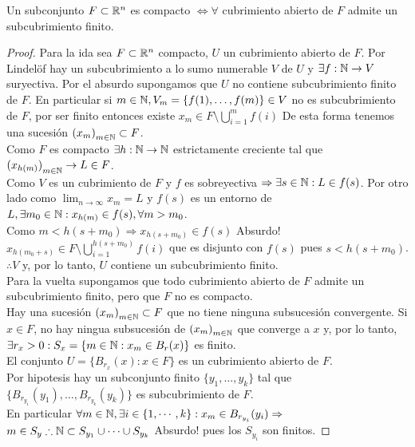 \begin{corollary}
  Un subconjunto \(F \subset \mathbb{R}^n\) es compacto \(\iff \forall \) cubrimiento abierto de \(F\) admite un subcubrimiento finito.
  \begin{proof}
    Para la ida sea \(F \subset \mathbb{R}^n\) compacto, \(U\) un cubrimiento abierto de \(F\). Por Lindelöf hay un subcubrimiento a lo sumo numerable \(V\) de \(U\) y \(\exists f: \mathbb{N} \to V\) suryectiva.
    Por el absurdo supongamos que \(U\) no contiene subcubrimiento finito de \(F\).
    En particular si \(m \in \mathbb{N}, V_m = \{ f(1), \ldots, f(m) \} \in V\) no es subcubrimiento de \(F\), por ser finito entonces existe \( x_m \in F \setminus \bigcup_{i = 1}^m f(i) \)
    De esta forma tenemos una sucesión \( {(x_m)}_{m \in \mathbb{N}} \subset F \). \\
    Como \(F\) es compacto \(\exists h: \mathbb{N} \to \mathbb{N} \) estrictamente creciente tal que \({(x_{h(m)})}_{m \in \mathbb{N}} \to L \in F\). \\
    Como \(V\) es un cubrimiento de \(F\) y \(f\) es sobreyectiva \(\Rightarrow \exists s \in \mathbb{N} : L \in f(s)\).
    Por otro lado como \(\lim_{n \to \infty} x_m = L\) y \(f(s)\) es un entorno de \(L, \exists m_0 \in \mathbb{N} : x_{h(m)} \in f(s), \forall m > m_0\). \\
    Como \(m < h(s + m_0) \Rightarrow x_{h(s+m_0)} \in f(s)\) Absurdo! \\
    \(x_{h(m_0 + s)} \in F \setminus \bigcup_{i=1}^{h(s+m_0)} f(i)\) que es disjunto con \(f(s)\) pues \(s < h(s + m_0)\). \\
    \(\therefore V\) y, por lo tanto, \(U\) contiene un subcubrimiento finito. \\
    Para la vuelta supongamos que todo cubrimiento abierto de \(F\) admite un
    subcubrimiento finito, pero que \(F\) no es compacto. \\ Hay una sucesión
    \({(x_m)}_{m \in \mathbb{N}} \subset F\) que no tiene ninguna subsucesión convergente. Si
    \(x \in F\), no hay ningua subsucesión de \({(x_m)}_{m \in \mathbb{N}} \) que converge a \(x\)
    y, por lo tanto, \(\exists r_x > 0 : S_x = \{ m \in \mathbb{N} : x_m \in B_r(x) \} \) es
    finito. \\ El conjunto \(U = \{ B_{r_x}(x) : x \in F \} \) es un cubrimiento
    abierto de \(F\). \\ Por hipotesis hay un subconjunto finito \( \{ y_1, \ldots,
    y_k\} \) tal que \( \{ B_{r_{y_1}}(y_1), \ldots, B_{r_{y_k}}(y_k) \} \) es
    subcubrimiento de \(F\). \\ En particular \(\forall m \in \mathbb{N}, \exists i \in \{ 1,
    \cdots, k \} : x_m \in B_{r_{y_i}}(y_i) \Rightarrow \) \\ \(m \in S_y \therefore
    \mathbb{N} \subset S_{y_1} \cup \cdots \cup S_{y_k} \) Absurdo! pues los \(S_{y_i} \) son
    finitos.
  \end{proof}
\end{corollary}

